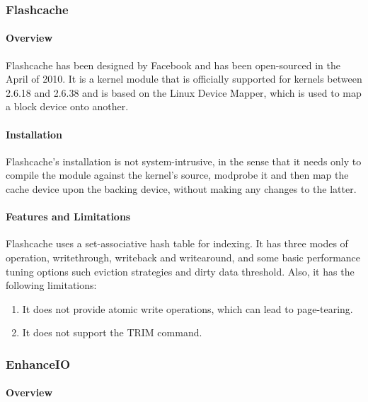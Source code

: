 \subsubsection{Flashcache}

\paragraph{Overview}

Flashcache has been designed by Facebook and has been open-sourced in the April 
of 2010. It is a kernel module that is officially supported for kernels between  
2.6.18 and 2.6.38 and is based on the Linux Device Mapper, which is used to map 
a block device onto another.

\paragraph{Installation}

Flashcache's installation is not system-intrusive, in the sense that it needs 
only to compile the module against the kernel's source, modprobe it and then 
map the cache device upon the backing device, without making any changes to the 
latter.

\paragraph{Features and Limitations}

Flashcache uses a set-associative hash table for indexing. It has three modes 
of operation, writethrough, writeback and writearound, and some basic 
performance tuning options such eviction strategies and dirty data threshold.  
Also, it has the following limitations:

\begin{enumerate}
	\item It does not provide atomic write operations, which can lead to 
		page-tearing.
	\item It does not support the TRΙΜ command.
\end{enumerate}

\subsubsection{EnhanceIO}

\paragraph{Overview}

